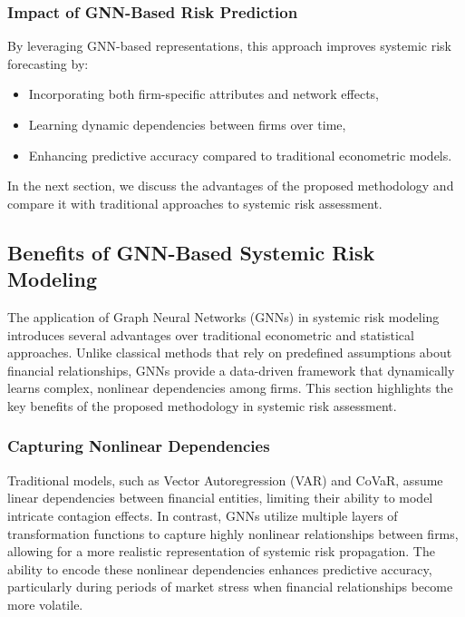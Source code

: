 \documentclass[preprint,12pt,authoryear]{elsarticle}
\begin{document}
\subsubsection{Impact of GNN-Based Risk Prediction}  

By leveraging GNN-based representations, this approach improves systemic risk forecasting by:
\begin{itemize}
    \item Incorporating both firm-specific attributes and network effects,
    \item Learning dynamic dependencies between firms over time,
    \item Enhancing predictive accuracy compared to traditional econometric models.
\end{itemize}

In the next section, we discuss the advantages of the proposed methodology and compare it with traditional approaches to systemic risk assessment.

\subsection{Benefits of GNN-Based Systemic Risk Modeling}  

The application of Graph Neural Networks (GNNs) in systemic risk modeling introduces several advantages over traditional econometric and statistical approaches. Unlike classical methods that rely on predefined assumptions about financial relationships, GNNs provide a data-driven framework that dynamically learns complex, nonlinear dependencies among firms. This section highlights the key benefits of the proposed methodology in systemic risk assessment.

\subsubsection{Capturing Nonlinear Dependencies}  

Traditional models, such as Vector Autoregression (VAR) and CoVaR, assume linear dependencies between financial entities, limiting their ability to model intricate contagion effects. In contrast, GNNs utilize multiple layers of transformation functions to capture highly nonlinear relationships between firms, allowing for a more realistic representation of systemic risk propagation. The ability to encode these nonlinear dependencies enhances predictive accuracy, particularly during periods of market stress when financial relationships become more volatile.
\end{document}
